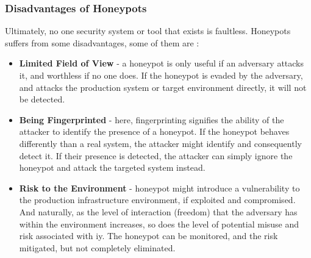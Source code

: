 \documentclass[grad,lot,lof,11pt,oneside,onehalfspace]{RUthesis}
\begin{document}
\subsubsection{Disadvantages of Honeypots}
Ultimately, no one security system or tool that exists is faultless. Honeypots suffers from some disadvantages,  some of them are \cite{nawrocki_survey_2016}:
\begin{itemize}
	\item{\textbf{Limited Field of View} -}
	a honeypot is only useful if an adversary attacks it, and worthless if no one does.  If the honeypot is evaded by the adversary, and attacks the production system or target environment directly, it will not be detected.  
	\item{\textbf{Being Fingerprinted} -}  
	here, fingerprinting signifies the ability of the attacker to identify the presence of a honeypot. If the honeypot behaves differently than a real system, the attacker might identify and consequently detect it. If their presence is detected, the attacker can simply ignore the honeypot and attack the targeted  system instead. 
	\item{\textbf{Risk to the Environment} -}
	honeypot might introduce a vulnerability to the production infrastructure environment, if exploited and compromised. And naturally, as the level of interaction (freedom) that the adversary has within the environment increases, so does the level of potential misuse and risk associated with iy. The honeypot can be monitored, and the risk mitigated, but not completely eliminated.  
\end{itemize}
\end{document}
